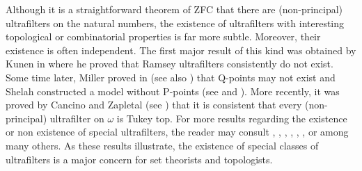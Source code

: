 \documentclass{article}%
\begin{document}
Although it is a straightforward theorem of \textsf{ZFC} that there are
(non-principal) ultrafilters on the natural numbers, the existence of
ultrafilters with interesting topological or combinatorial properties is far
more subtle. Moreover, their existence is often independent. The first major
result of this kind was obtained by Kunen in \cite{KunenSomePoints} where he
proved that Ramsey ultrafilters consistently do not exist. Some time later,
Miller proved in \cite{NoQpointsMiller} (see also \cite{Rat}) that
\textsf{Q}-points may not exist and Shelah constructed a model without
\textsf{P}-points (see \cite{Wimmers} and \cite{ProperandImproper}). More
recently, it was proved by Cancino and Zapletal (see \cite{IsbellProblem})
that it is consistent that every (non-principal) ultrafilter on $\omega$ is
Tukey top. For more results regarding the existence or non existence of
special ultrafilters, the reader may consult \cite{betaomega},
\cite{ShelahNowheredense}, \cite{Brendlenowheredense},
\cite{PseudoPpointsandSplittingNumber}, \cite{GruffUltrafilters},
\cite{TherearenoPpointsinSilverExtensions}, \cite{AboveFsigma} or
\cite{OnPospisilIdeals} among many others. As these results illustrate, the
existence of special classes of ultrafilters is a major concern for set
theorists and topologists.

\qquad\qquad
\end{document}
